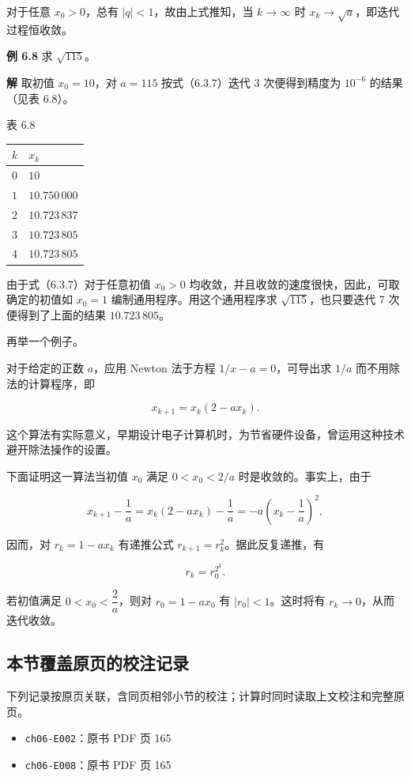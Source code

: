 \documentclass[
  10pt,
  fontset=fandol]{ctexart}
\newcounter{none} %
\providecommand{\tightlist}{%
  \setlength{\itemsep}{0pt}\setlength{\parskip}{0pt}}
\begin{document}
对于任意 \(x_0>0\)，总有 \(|q|<1\)，故由上式推知，当 \(k\to\infty\) 时 \(x_k\to\sqrt{a}\)，即迭代过程恒收敛。

\textbf{例 6.8} 求 \(\sqrt{115}\)。

\textbf{解} 取初值 \(x_0=10\)，对 \(a=115\) 按式（6.3.7）迭代 3 次便得到精度为 \(10^{-6}\) 的结果（见表 6.8）。

表 6.8

{\def\LTcaptype{none} %
\begin{longtable}[]{@{}ll@{}}
\toprule\noalign{}
\(k\) & \(x_k\) \\
\midrule\noalign{}
\endhead
\bottomrule\noalign{}
\endlastfoot
\(0\) & \(10\) \\
\(1\) & \(10.750\,000\) \\
\(2\) & \(10.723\,837\) \\
\(3\) & \(10.723\,805\) \\
\(4\) & \(10.723\,805\) \\
\end{longtable}
}

由于式（6.3.7）对于任意初值 \(x_0>0\) 均收敛，并且收敛的速度很快，因此，可取确定的初值如 \(x_0=1\) 编制通用程序。用这个通用程序求 \(\sqrt{115}\)，也只要迭代 7 次便得到了上面的结果 \(10.723\,805\)。

再举一个例子。

对于给定的正数 \(a\)，应用 Newton 法于方程 \(1/x-a=0\)，可导出求 \(1/a\) 而不用除法的计算程序，即

\[
x_{k+1}=x_k(2-ax_k).
\]

这个算法有实际意义，早期设计电子计算机时，为节省硬件设备，曾运用这种技术避开除法操作的设置。

下面证明这一算法当初值 \(x_0\) 满足 \(0<x_0<2/a\) 时是收敛的。事实上，由于

\[
x_{k+1}-\frac{1}{a}=x_k(2-ax_k)-\frac{1}{a}=-a\left(x_k-\frac{1}{a}\right)^2,
\]

因而，对 \(r_k=1-ax_k\) 有递推公式 \(r_{k+1}=r_k^2\)。据此反复递推，有

\[
r_k=r_0^{2^k}.
\]

若初值满足 \(0<x_0<\dfrac{2}{a}\)，则对 \(r_0=1-ax_0\) 有 \(|r_0|<1\)。这时将有 \(r_k\to0\)，从而迭代收敛。

\subsection{本节覆盖原页的校注记录}\label{ux672cux8282ux8986ux76d6ux539fux9875ux7684ux6821ux6ce8ux8bb0ux5f55}

下列记录按原页关联，含同页相邻小节的校注；计算时同时读取上文校注和完整原页。

\begin{itemize}
\tightlist
\item
  \texttt{ch06-E002}：原书 PDF 页 165
\item
  \texttt{ch06-E008}：原书 PDF 页 165
\end{itemize}
\end{document}
